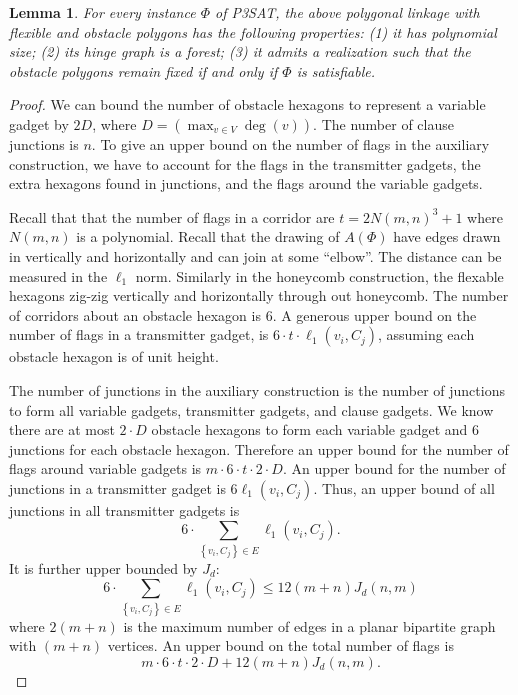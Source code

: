 \documentclass[10pt]{CSUNthesis}
\theoremstyle{plain}%
\newtheorem{lem}{Lemma}
\theoremstyle{definition}
\theoremstyle{remark}
\newcommand{\lr}[1]{\left( #1 \right)}
\begin{document}
\begin{lem}\label{lem:aux-A}
For every instance $\Phi$ of P3SAT, the above polygonal linkage with flexible and obstacle polygons has the following properties: (1) it has polynomial size; (2) its hinge graph is a forest;
(3) it admits a realization such that the obstacle polygons remain fixed if and only if $\Phi$ is satisfiable.
\end{lem}
\begin{proof}

We can bound the number of obstacle hexagons to represent a variable gadget by $2 D$, where $D = \lr{ \max_{v \in V} \deg (v)}$.  
The number of clause junctions is $n$.
To give an upper bound on the number of flags in the auxiliary construction, we have to account for the flags in the transmitter gadgets, the extra hexagons found in junctions, and the flags around the variable gadgets.

Recall that that the number of flags in a corridor are $ t = 2N(m,n)^3 + 1 $ where $N(m,n)$ is a polynomial. 
Recall that the drawing of $A(\Phi)$ have edges drawn in vertically and horizontally and can join at some ``elbow''.  
The distance can be measured in the $\ell_1$ norm.
Similarly in the honeycomb construction, the flexable hexagons zig-zig vertically and horizontally through out honeycomb.  
The number of corridors about an obstacle hexagon is $6$.
A generous upper bound on the number of flags in a transmitter gadget, is $6 \cdot t \cdot \ell_1\lr{v_i,C_j}$, assuming each obstacle hexagon is of unit height.

The number of junctions in the auxiliary construction is the number of junctions to form all variable gadgets, transmitter gadgets, and clause gadgets. 
We know there are at most $2 \cdot D$ obstacle hexagons to form each variable gadget and $6$ junctions for each obstacle hexagon.  
Therefore an upper bound for the number of flags around variable gadgets is $m \cdot 6 \cdot t \cdot 2 \cdot D$.
An upper bound for the number of junctions in a transmitter gadget is $6 \ell_1 \lr{v_i, C_j}$.  
Thus, an upper bound of all junctions in all transmitter gadgets is $$6 \cdot \sum_{\left\lbrace v_i, C_j \right\rbrace \in E} \ell_1 \lr{v_i, C_j}.$$
It is further upper bounded by  $J_d$:
$$6 \cdot \sum_{\left\lbrace v_i, C_j \right\rbrace \in E} \ell_1 \lr{v_i, C_j} \leq 12 (m+n) J_d(n,m)$$
where $2 (m+n)$ is the maximum number of edges in a planar bipartite graph with $(m+n)$ vertices.  
An upper bound on the total number of flags is
$$m \cdot 6 \cdot t \cdot 2 \cdot D + 12 (m+n) J_d(n,m).$$


\end{proof}
\end{document}
